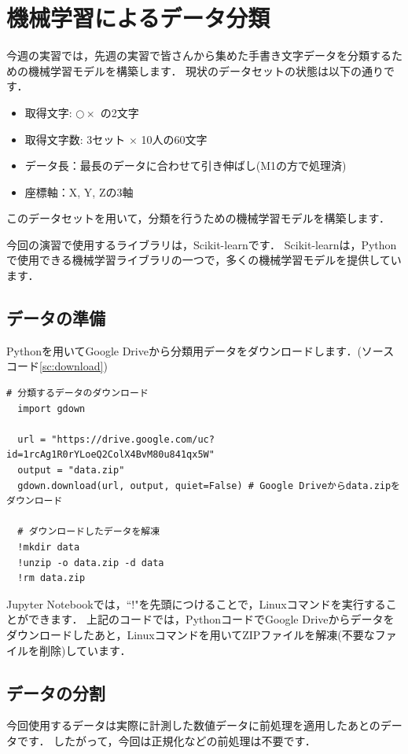 \documentclass{jarticle}
\begin{document}
\section{機械学習によるデータ分類}
今週の実習では，先週の実習で皆さんから集めた手書き文字データを分類するための機械学習モデルを構築します．
現状のデータセットの状態は以下の通りです．

\begin{itemize}
  \item 取得文字: $ \bigcirc  \times $ の2文字
  \item 取得文字数: 3セット $ \times $ 10人の60文字
  \item データ長：最長のデータに合わせて引き伸ばし(M1の方で処理済)
  \item 座標軸：X, Y, Zの3軸
\end{itemize}

このデータセットを用いて，分類を行うための機械学習モデルを構築します．

今回の演習で使用するライブラリは，Scikit-learnです．
Scikit-learnは，Pythonで使用できる機械学習ライブラリの一つで，多くの機械学習モデルを提供しています．


\subsection{データの準備}
Pythonを用いてGoogle Driveから分類用データをダウンロードします．(ソースコード\ref{sc:download})

\begin{lstlisting}[caption=データのダウンロード, label=sc:download]
  # 分類するデータのダウンロード
  import gdown

  url = "https://drive.google.com/uc?id=1rcAg1R0rYLoeQ2ColX4BvM80u841qx5W"
  output = "data.zip"
  gdown.download(url, output, quiet=False) # Google Driveからdata.zipをダウンロード

  # ダウンロードしたデータを解凍
  !mkdir data
  !unzip -o data.zip -d data
  !rm data.zip
\end{lstlisting}

Jupyter Notebookでは，``!"を先頭につけることで，Linuxコマンドを実行することができます．
上記のコードでは，PythonコードでGoogle Driveからデータをダウンロードしたあと，Linuxコマンドを用いてZIPファイルを解凍(不要なファイルを削除)しています．

\subsection{データの分割}
今回使用するデータは実際に計測した数値データに前処理を適用したあとのデータです．
したがって，今回は正規化などの前処理は不要です．
\end{document}
